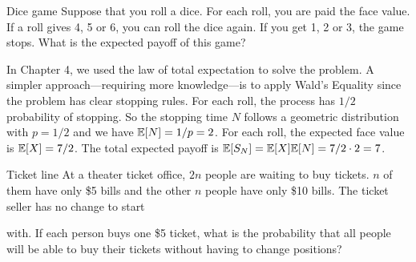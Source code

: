 \begin{problem}{Dice game}
Suppose that you roll a dice. For each roll, you are paid the face value. If a roll gives
4, 5 or 6, you can roll the dice again. If you get 1, 2 or 3, the game stops. What is the
expected payoff of this game?
\end{problem}

\begin{solution}
In Chapter 4, we used the law of total expectation to solve the problem. A simpler
approach---requiring more knowledge---is to apply Wald's Equality since the problem has
clear stopping rules. For each roll, the process has $1/2$ probability of stopping. So the
stopping time $N$ follows a geometric distribution with $p=1/2$ and we have
\mbox{$\mathbb{E}[N]=1/p=2$}. For each roll, the expected face value is $\mathbb{E}[X]=7/2$. The total expected
payoff is $\mathbb{E}[S_N]=\mathbb{E}[X]\mathbb{E}[N]=7/2\cdot2=7$.

\end{solution}

\begin{problem}{Ticket line}
At a theater ticket office, $2n$ people are waiting to buy tickets. $n$ of them have only
\$5 bills and the other $n$ people have only \$10 bills. The ticket seller has no change to start


with. If each person buys one \$5 ticket, what is the probability that all people will be able
to buy their tickets without having to change positions?
\end{problem}

